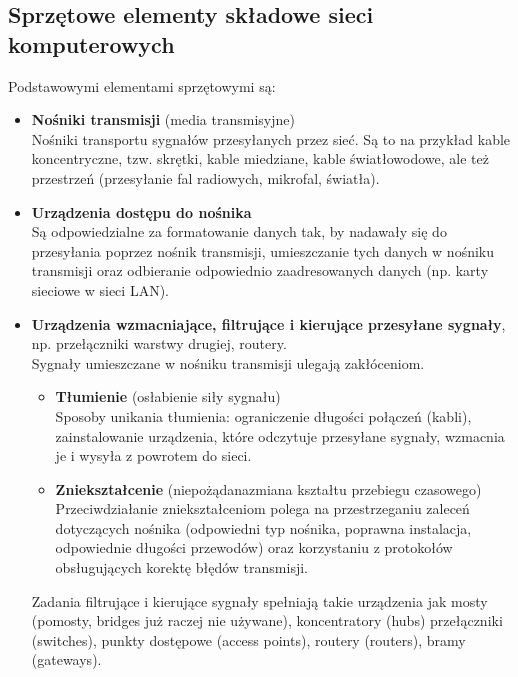 \documentclass[../main.tex]{subfiles}
\begin{document}
    \subsection{Sprzętowe	elementy	składowe	sieci	komputerowych}
    Podstawowymi	elementami	sprzętowymi	są:
    \begin{itemize}
        \item \textbf{Nośniki	transmisji}	(media	transmisyjne)\\
        Nośniki	 transportu	 sygnałów	 przesyłanych	 przez	 sieć. Są to na przykład kable koncentryczne, tzw.
        skrętki, kable miedziane,  kable	 światłowodowe,	 ale	 też	 przestrzeń (przesyłanie	fal	radiowych,	mikrofal,	światła).
        \item \textbf{Urządzenia	dostępu do	nośnika}\\
        Są odpowiedzialne za	formatowanie danych	tak, by nadawały się do	 przesyłania poprzez nośnik	 transmisji, umieszczanie	 tych	 danych	 w nośniku	transmisji	oraz	odbieranie	odpowiednio zaadresowanych	danych	(np. karty sieciowe w sieci LAN).
        \item \textbf{Urządzenia	wzmacniające,	filtrujące	i	kierujące	przesyłane	sygnały},	np.	przełączniki warstwy	drugiej, routery.\\
        Sygnały	 umieszczane w	 nośniku transmisji ulegają zakłóceniom.
        \begin{itemize}
            \item \textbf{Tłumienie} (osłabienie siły sygnału)\\
            Sposoby unikania tłumienia:  ograniczenie	 długości	 połączeń	 (kabli), zainstalowanie	urządzenia,	które odczytuje	przesyłane	sygnały,	wzmacnia	je	i
            wysyła	z	powrotem	do	sieci.
            \item \textbf{Zniekształcenie} (niepożądanazmiana kształtu przebiegu czasowego)\\
            Przeciwdziałanie	 zniekształceniom polega	 na	 przestrzeganiu	 zaleceń dotyczących	 nośnika	 (odpowiedni typ nośnika, poprawna instalacja, odpowiednie	 długości	 przewodów) oraz korzystaniu z protokołów obsługujących korektę	błędów	transmisji.
        \end{itemize}
        Zadania	filtrujące	i	kierujące	sygnały	spełniają	takie	urządzenia	jak	mosty (pomosty,	bridges już	 raczej	 nie	 używane),	 koncentratory (hubs)	 przełączniki (switches), punkty	 dostępowe (access points), routery (routers),	bramy (gateways).
    \end{itemize}
\end{document}
